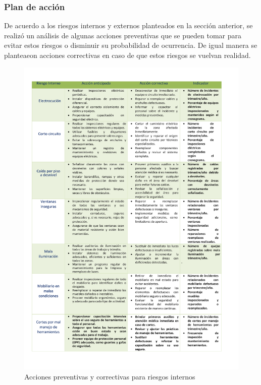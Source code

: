     \subsubsection{Plan de acción}
    De acuerdo a los riesgos internos y externos planteados en la sección anterior, se realizó un análisis de algunas acciones preventivas que se pueden tomar para evitar estos riesgos o disminuir su probabilidad de ocurrencia. De igual manera se planteaeon acciones correctivas en caso de que estos riesgos se vuelvan realidad.
    \begin{figure}[H]
        \centering
        \includegraphics[scale=0.3]{32/img/accionesRiesgosInternos.pdf}
        \caption{Acciones preventivas y correctivas para riesgos internos}
        \label{fig:enter-label}
    \end{figure}
